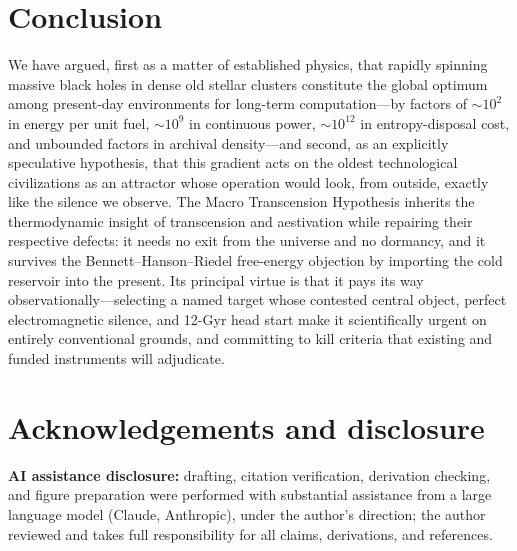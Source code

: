 \documentclass[11pt]{article}
\begin{document}
\section{Conclusion}\label{sec:conclusion}
We have argued, first as a matter of established physics, that rapidly spinning massive black holes in dense old stellar clusters constitute the global optimum among present-day environments for long-term computation---by factors of ${\sim}10^{2}$ in energy per unit fuel, ${\sim}10^{9}$ in continuous power, ${\sim}10^{12}$ in entropy-disposal cost, and unbounded factors in archival density---and second, as an explicitly speculative hypothesis, that this gradient acts on the oldest technological civilizations as an attractor whose operation would look, from outside, exactly like the silence we observe. The Macro Transcension Hypothesis inherits the thermodynamic insight of transcension and aestivation while repairing their respective defects: it needs no exit from the universe and no dormancy, and it survives the Bennett--Hanson--Riedel free-energy objection by importing the cold reservoir into the present. Its principal virtue is that it pays its way observationally---selecting a named target whose contested central object, perfect electromagnetic silence, and 12-Gyr head start make it scientifically urgent on entirely conventional grounds, and committing to kill criteria that existing and funded instruments will adjudicate.

\section*{Acknowledgements and disclosure}
\textbf{AI assistance disclosure:} drafting, citation verification, derivation checking, and figure preparation were performed with substantial assistance from a large language model (Claude, Anthropic), under the author's direction; the author reviewed and takes full responsibility for all claims, derivations, and references.
\end{document}
